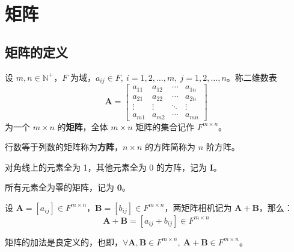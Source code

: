 \section{矩阵}

\subsection{矩阵的定义}
\begin{definition}[矩阵 Matrix]
    设 $m,n\in\mathbb{N}^+$，$F$ 为域，$a_{ij}\in F,\ i=1,2,\ldots,m,\ j=1,2,\ldots,n$。称二维数表
    \[
        \mathbf{A} = \begin{bmatrix}
            a_{11} & a_{12} & \cdots & a_{1n} \\
            a_{21} & a_{22} & \cdots & a_{2n} \\
            \vdots & \vdots & \ddots & \vdots \\
            a_{m1} & a_{m2} & \cdots & a_{mn}
        \end{bmatrix}
    \]
    为一个 $m \times n$ 的\textbf{矩阵}，全体 $m \times n$ 矩阵的集合记作 $F^{m \times n}$。
\end{definition}

\begin{definition}
    行数等于列数的矩阵称为\textbf{方阵}，$n \times n$ 的方阵简称为 $n$ 阶方阵。
\end{definition}

\begin{definition}
    对角线上的元素全为 1，其他元素全为 0 的方阵，记为 $\mathbf{I}$。
\end{definition}

\begin{definition}
    所有元素全为零的矩阵，记为 $\mathbf{0}$。
\end{definition}

\begin{definition}
    设 $\mathbf{A} = [a_{ij}] \in F^{m \times n}$，$\mathbf{B} = [b_{ij}] \in F^{m \times n}$，两矩阵相机记为 $\mathbf{A} + \mathbf{B}$，那么：
    \[
       \mathbf{A} + \mathbf{B} = [a_{ij} + b_{ij}] \in F^{m \times n}
    \]
\end{definition}

\begin{proposition}
    矩阵的加法是良定义的，也即，$\forall \mathbf{A},\mathbf{B}\in F^{m \times n},\ \mathbf{A}+\mathbf{B}\in F^{m \times n}$。
\end{proposition}

